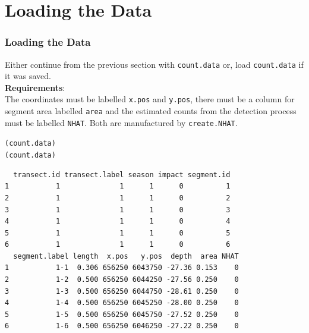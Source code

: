 \section{Loading the Data}
\begin{frame}[fragile]
\frametitle{Loading the Data}
Either continue from the previous section with {\tt count.data} or, load {\tt count.data} if it was saved.\\

\noindent \textbf{Requirements}:\\

\noindent The coordinates must be labelled {\tt x.pos} and {\tt y.pos}, there must be a column for segment area labelled {\tt area} and the estimated counts from the detection process must be labelled {\tt NHAT}. Both are manufactured by {\tt create.NHAT}. 

\begin{knitrout}\footnotesize
{}\color{fgcolor}\begin{kframe}
\begin{alltt}
(count.data)
(count.data)
\end{alltt}
\begin{verbatim}
  transect.id transect.label season impact segment.id
1           1              1      1      0          1
2           1              1      1      0          2
3           1              1      1      0          3
4           1              1      1      0          4
5           1              1      1      0          5
6           1              1      1      0          6
  segment.label length  x.pos   y.pos  depth  area NHAT
1           1-1  0.306 656250 6043750 -27.36 0.153    0
2           1-2  0.500 656250 6044250 -27.56 0.250    0
3           1-3  0.500 656250 6044750 -28.61 0.250    0
4           1-4  0.500 656250 6045250 -28.00 0.250    0
5           1-5  0.500 656250 6045750 -27.52 0.250    0
6           1-6  0.500 656250 6046250 -27.22 0.250    0
\end{verbatim}
\end{kframe}
\end{knitrout}
\end{frame}

